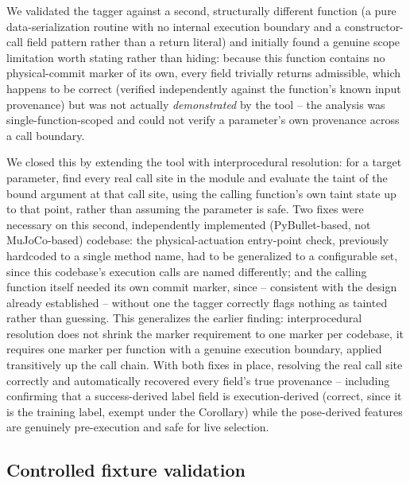 \documentclass[journal]{IEEEtran}
\begin{document}
We validated the tagger against a second, structurally different function
(a pure data-serialization routine with no internal execution boundary
and a constructor-call field pattern rather than a return literal) and
initially found a genuine scope limitation worth stating rather than
hiding: because this function contains no physical-commit marker of its
own, every field trivially returns admissible, which happens to be
correct (verified independently against the function's known input
provenance) but was not actually \emph{demonstrated} by the tool -- the
analysis was single-function-scoped and could not verify a parameter's
own provenance across a call boundary.

We closed this by extending the tool with interprocedural resolution: for
a target parameter, find every real call site in the module and evaluate
the taint of the bound argument at that call site, using the calling
function's own taint state up to that point, rather than assuming the
parameter is safe. Two fixes were necessary on this second, independently
implemented (PyBullet-based, not MuJoCo-based) codebase: the
physical-actuation entry-point check, previously hardcoded to a single
method name, had to be generalized to a configurable set, since this
codebase's execution calls are named differently; and the calling
function itself needed its own commit marker, since -- consistent with
the design already established -- without one the tagger correctly flags
nothing as tainted rather than guessing. This generalizes the earlier
finding: interprocedural resolution does not shrink the marker
requirement to one marker per codebase, it requires one marker per
function with a genuine execution boundary, applied transitively up the
call chain. With both fixes in place, resolving the real call site
correctly and automatically recovered every field's true provenance --
including confirming that a success-derived label field is
execution-derived (correct, since it is the training label, exempt under
the Corollary) while the pose-derived features are genuinely
pre-execution and safe for live selection.

\subsection{Controlled fixture validation}
\label{sec:fixtures}
\end{document}
